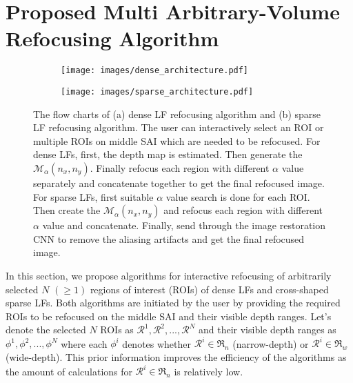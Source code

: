 \section{Proposed Multi Arbitrary-Volume Refocusing Algorithm} \label{sec:methodology}

\begin{figure*}[!ht]
    \centering
    \begin{subfigure}[c]{0.5\textwidth}
         \centering
         \texttt{[image: images/dense\_architecture.pdf]}
         \caption{ }
         \label{fig:dense_refocus_pipeline}
     \end{subfigure}
     \hfill
    \begin{subfigure}[c]{1\textwidth}
         \centering
         \texttt{[image: images/sparse\_architecture.pdf]}
         \caption{ }
         \label{fig:sparse_refocus_pipeline}
     \end{subfigure}
     \hfill
    
    \caption{The flow charts of (a) dense LF refocusing algorithm and (b) sparse LF refocusing algorithm. The user can interactively select an ROI or multiple ROIs on middle SAI which are needed to be refocused. For dense LFs, first, the depth map is estimated. Then generate the $\mathcal{M}_{\alpha}(n_x,n_y)$. Finally refocus each region with different $\alpha$ value separately and concatenate together to get the final refocused image. For sparse LFs, first suitable $\alpha$ value search is done for each ROI. Then create the $\mathcal{M}_{\alpha}(n_x,n_y)$ and refocus each region with different $\alpha$ value and concatenate. Finally, send through the image restoration CNN to remove the aliasing artifacts and get the final refocused image.}
    \label{fig:architecture}
\end{figure*}


In this section, we propose algorithms for interactive refocusing of arbitrarily selected $N$ $(\geq 1)$ regions of interest (ROIs) of dense LFs and cross-shaped sparse LFs. Both algorithms are initiated by the user by providing the required ROIs to be refocused on the middle SAI and their visible depth ranges. Let's denote the selected $N$ ROIs as $\mathcal{R}^1, \mathcal{R}^2, ..., \mathcal{R}^N$ and their visible depth ranges as $\phi^1, \phi^2, ..., \phi^N$ where each $\phi^i$ denotes whether $\mathcal{R}^i \in \mathfrak{R}_{n}$ (narrow-depth) or $\mathcal{R}^i \in \mathfrak{R}_{w}$ (wide-depth). This prior information improves the efficiency of the algorithms as the amount of calculations for $\mathcal{R}^i \in \mathfrak{R}_{n}$ is relatively low.

